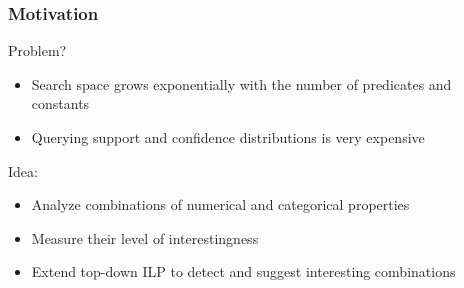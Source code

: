 \documentclass{beamer}
\begin{document}
\begin{frame}
\frametitle{Motivation}
 Problem?
 \begin{itemize}
    \item Search space grows exponentially with the number of predicates and constants
    \item Querying support and confidence distributions is very expensive
 \end{itemize}
 Idea:
 \begin{itemize}
    \item Analyze combinations of numerical and categorical properties
    \item Measure their level of interestingness
    \item Extend top-down ILP to detect and suggest interesting combinations
 \end{itemize}
\end{frame}
\end{document}
